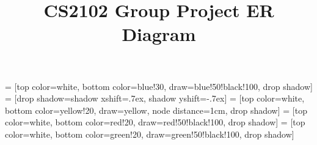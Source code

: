 \documentclass[a4paper,12pt,landscape]{article}
\begin{document}
\title{CS2102 Group Project ER Diagram}

\thispagestyle{empty}

\usetikzlibrary{positioning}
\usetikzlibrary{shadows}

 = [top color=white, bottom color=blue!30, 
                            draw=blue!50!black!100, drop shadow]
 = [drop shadow={shadow xshift=.7ex, 
                                 shadow yshift=-.7ex}]
 = [top color=white, bottom color=yellow!20, 
                               draw=yellow, node distance=1cm, drop shadow]
 = [top color=white, bottom color=red!20, 
                                  draw=red!50!black!100, drop shadow]
 = [top color=white, bottom color=green!20, 
                         draw=green!50!black!100, drop shadow]
\end{document}
